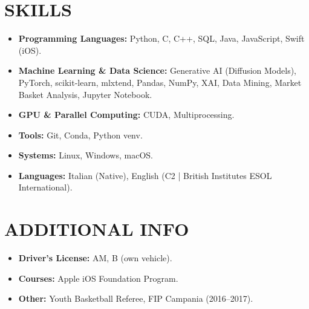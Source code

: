 \documentclass[10pt,a4paper]{article}
\begin{document}
\section*{SKILLS}
\begin{itemize}\small
  \item \textbf{\textcolor{primary}{Programming Languages:}} Python, C, C++, SQL, Java, JavaScript, Swift (iOS).
  \item \textbf{\textcolor{primary}{Machine Learning \& Data Science:}} Generative AI (Diffusion Models), PyTorch, scikit-learn, mlxtend, Pandas, NumPy, XAI, Data Mining, Market Basket Analysis, Jupyter Notebook.
  \item \textbf{\textcolor{primary}{GPU \& Parallel Computing:}} CUDA, Multiprocessing.
  \item \textbf{\textcolor{primary}{Tools:}} Git, Conda, Python venv.
  \item \textbf{\textcolor{primary}{Systems:}} Linux, Windows, macOS.
  \item \textbf{\textcolor{primary}{Languages:}} Italian (Native), English (C2 \textcolor{secondary}{|} British Institutes ESOL International).
\end{itemize}

\section*{ADDITIONAL INFO}
\begin{itemize}\small
  \item \textbf{\textcolor{primary}{Driver's License:}} AM, B (own vehicle).
  \item \textbf{\textcolor{primary}{Courses:}} Apple iOS Foundation Program.
  \item \textbf{\textcolor{primary}{Other:}} Youth Basketball Referee, FIP Campania (2016--2017).
\end{itemize}

\end{document}
